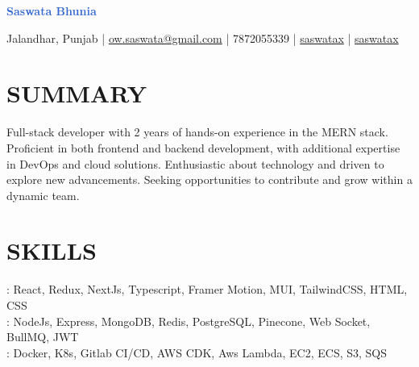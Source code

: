 \documentclass[]{resume}
\begin{document}
\textrm{\Huge\textcolor{highlight}{\textbf{Saswata Bhunia}}}
\vspace{.2em}

Jalandhar, Punjab | \href{mailto:ow.saswata@gmail.com}{ow.saswata@gmail.com} | 7872055339 | \href{https://www.linkedin.com/in/saswatax}{\faLinkedin \space saswatax} | \href{https://github.com/saswatax}{\faGithub \space saswatax}

\section{SUMMARY}
Full-stack developer with 2 years of hands-on experience in the MERN stack. Proficient in both frontend and backend development, with additional expertise in DevOps and cloud solutions. Enthusiastic about technology and driven to explore new advancements. Seeking opportunities to contribute and grow within a dynamic team.

\section{SKILLS}
: React, Redux, NextJs, Typescript, Framer Motion, MUI, TailwindCSS, HTML, CSS \\
: NodeJs, Express, MongoDB, Redis, PostgreSQL, Pinecone, Web Socket, BullMQ, JWT \\
: Docker, K8s, Gitlab CI/CD, AWS CDK, Aws Lambda, EC2, ECS, S3, SQS
\end{document}
